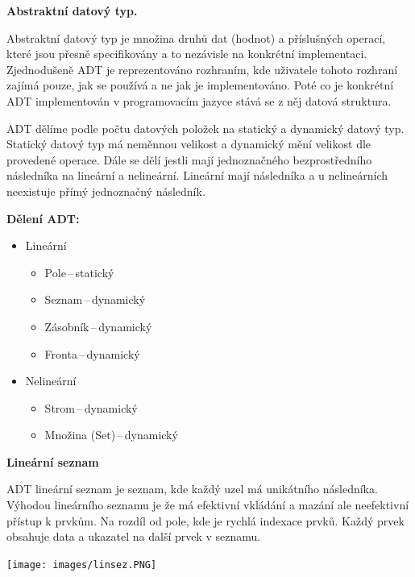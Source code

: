 \begin{Large}\vspace{0,5cm} \textbf{Abstraktní datový typ.}
\end{Large}

Abstraktní datový typ je množina druhů dat (hodnot) a příslušných operací, které jsou přesně specifikovány a to nezávisle na konkrétní implementaci. Zjednodušeně ADT je reprezentováno rozhraním, kde uživatele tohoto rozhraní zajímá pouze, jak se používá a ne jak je implementováno. Poté co je konkrétní ADT implementován v programovacím jazyce stává se z něj datová struktura.

ADT dělíme podle počtu datových položek na statický a dynamický datový typ. Statický datový typ má neměnnou velikost a dynamický mění velikost dle provedené operace. Dále se dělí jestli mají jednoznačného bezprostředního následníka na lineární a nelineární. Lineární mají následníka a u nelineárních neexistuje přímý jednoznačný následník.

\textbf{Dělení ADT:}
\begin{itemize}
    \item Lineární
    \begin{itemize}
        \item Pole\,--\,statický
        \item Seznam\,--\,dynamický
        \item Zásobník\,--\,dynamický
        \item Fronta\,--\,dynamický
    \end{itemize}
    \item Nelineární
    \begin{itemize}
        \item Strom\,--\,dynamický
        \item Množina (Set)\,--\,dynamický
    \end{itemize}
\end{itemize}

\begin{Large}\vspace{0,5cm} \textbf{Lineární seznam}
\end{Large}

ADT lineární seznam je seznam, kde každý uzel má unikátního následníka.
Výhodou lineárního seznamu je že má efektivní vkládání a mazání ale neefektivní přístup k prvkům. Na rozdíl od pole, kde je rychlá indexace prvků. Každý prvek obsahuje data a ukazatel na další prvek v seznamu.
\begin{center}
    \texttt{[image: images/linsez.PNG]}
\end{center}

